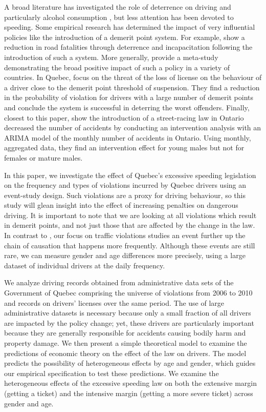 A broad literature has investigated the role of deterrence on driving 
and particularly alcohol consumption 
\citep[e.g.][]{hansen2015}, 
but less attention has been devoted to speeding. 
Some empirical research has determined the impact of very influential policies 
like the introduction of a demerit point system. 
For example, 
\citet{bennedittiniNicita2009} 
show a reduction in road fatalities 
through deterrence and incapacitation following the introduction of such a system. 
More generally, 
\citet{castillocastro2012} 
provide a meta-study 
demonstrating the broad positive impact of such a policy in a variety of countries. 
In Quebec, 
\citet{dionneetal2011} 
focus on the threat of the loss of license 
on the behaviour of a driver close to the demerit point threshold of suspension. 
They find a reduction in the probability of violation for drivers 
with a large number of demerit points and conclude 
the system is successful in deterring the worst offenders. 
Finally, closest to this paper, 
\citet{meirambayeva2014} 
show the introduction of a street-racing law in Ontario decreased the number of accidents 
by conducting an intervention analysis with an ARIMA model of 
the monthly number of accidents in Ontario.
%
Using monthly, aggregated data, 
they find an intervention effect for young males
but not for females or mature males. 


In this paper, we investigate the effect of Quebec’s excessive speeding legislation
on the frequency and types of violations incurred by Quebec drivers 
using an event-study design. 
Such violations are a proxy for driving behaviour, 
so this study will glean insight into the effect of increasing penalties on dangerous driving. 
It is important to note that we are looking at all violations which result in demerit points, 
and not just those that are affected by the change in the law. 
% 
In contrast to \citet{meirambayeva2014}, 
our focus on traffic violations
studies an event further up the chain of causation that happens more frequently. 
Although these events are still rare,
we can measure gender and age differences more precisely, 
using a large dataset of individual drivers at the daily frequency. 

We analyze driving records obtained from administrative data sets 
of the Government of Quebec comprising the universe of violations 
from 2006 to 2010 and records on drivers’ licenses over the same period. 
The use of large administrative datasets is necessary because only a small fraction 
of all drivers are impacted by the policy change; 
yet, these drivers are particularly important because they are 
generally responsible for accidents causing bodily harm and property damage. 
% 
We then present a simple theoretical model to examine the predictions of economic theory 
on the effect of the law on drivers.
%
The model predicts the possibility of heterogeneous effects by age and gender,  
which guides our empirical specification to test these predictions. 
% 
We examine the heterogeneous effects of the excessive speeding law 
on both the extensive margin (getting a ticket) 
and the intensive margin (getting a more severe ticket) across gender and age. 



